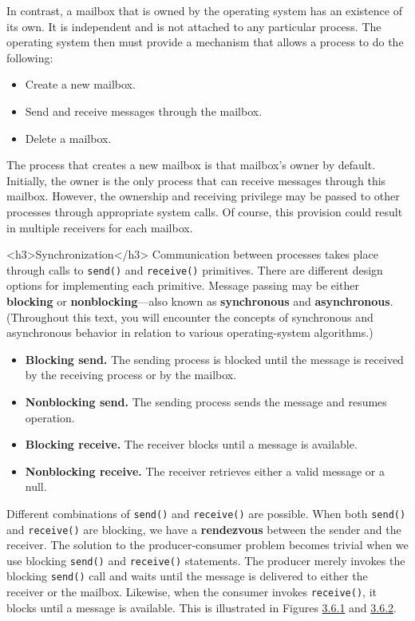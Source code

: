 In contrast, a mailbox that is owned by the operating system has an existence of its own. It is independent and is not attached to any particular process. The operating system then must provide a mechanism that allows a process to do the following:
\begin{itemize}
\item Create a new mailbox.
\item Send and receive messages through the mailbox.
\item Delete a mailbox.
\end{itemize}
The process that creates a new mailbox is that mailbox's owner by default. Initially, the owner is the only process that can receive messages through this mailbox. However, the ownership and receiving privilege may be passed to other processes through appropriate system calls. Of course, this provision could result in multiple receivers for each mailbox.

<h3>Synchronization</h3>
Communication between processes takes place through calls to \texttt{send()} and \texttt{receive()} primitives. There are different design options for implementing each primitive. Message passing may be either \textbf{blocking} or \textbf{nonblocking}---also known as \textbf{synchronous} and \textbf{asynchronous}. (Throughout this text, you will encounter the concepts of synchronous and asynchronous behavior in relation to various operating-system algorithms.)
\begin{itemize}
\item \textbf{Blocking send.} The sending process is blocked until the message is received by the receiving process or by the mailbox.
\item \textbf{Nonblocking send.} The sending process sends the message and resumes operation.
\item \textbf{Blocking receive.} The receiver blocks until a message is available.
\item \textbf{Nonblocking receive.} The receiver retrieves either a valid message or a null.
\end{itemize}
Different combinations of \texttt{send()} and \texttt{receive()} are possible. When both \texttt{send()} and \texttt{receive()} are blocking, we have a \textbf{rendezvous} between the sender and the receiver. The solution to the producer-consumer problem becomes trivial when we use blocking \texttt{send()} and \texttt{receive()} statements. The producer merely invokes the blocking \texttt{send()} call and waits until the message is delivered to either the receiver or the mailbox. Likewise, when the consumer invokes \texttt{receive()}, it blocks until a message is available. This is illustrated in Figures \hyperref[fig:producer-message-passing]{3.6.1} and \hyperref[fig:consumer-message-passing]{3.6.2}.

